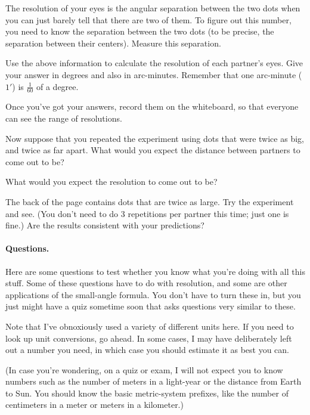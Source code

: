 
The resolution of your eyes is the angular separation between the
two dots when you can just barely tell that there are two of them.
To figure out this number, you need to know the 
separation between the two dots (to be precise, the separation between
their centers). Measure this separation.

\answerspace{1in}

Use the above information to calculate the resolution of each
partner's eyes. Give your answer in degrees and also in
arc-minutes. Remember that one arc-minute ($1'$) is $\frac{1}{60}$ of
a degree.

\answerspace{2.5in}

Once you've got your answers, record them on the whiteboard,
so that everyone can see the range of resolutions.

Now suppose that you repeated the experiment using dots that
were twice as big, and twice as far apart.
What would you expect the distance between partners to come out to be?

\answerspace{1in}

What would you expect the resolution to come out to be?

\answerspace{1in}

The back of the page contains dots that are twice as large.
Try the experiment and see. (You don't need to do 3 repetitions per partner
this time; just one is fine.) Are the results consistent with
your predictions?

\answerspace{1in}

\paragraph{Questions.}

Here are some questions to test whether you know what you're doing
with all this stuff. Some of these questions have to
do with resolution, and some are other applications of
the small-angle formula.
You don't have to turn these in, but 
you just might have a quiz sometime soon that asks questions very similar
to these.

Note that I've obnoxiously used a variety of different units here.
If you need to look up unit conversions, go ahead. 
In some cases, I may have deliberately left out a number you need, in which case
you should estimate it as best you can.

(In case you're wondering, on a quiz or exam, I will not expect you to know 
numbers such as the number of meters
in a light-year or the distance from Earth to Sun.
You should know the basic
metric-system prefixes, like the number of centimeters in a meter
or meters in a kilometer.)

